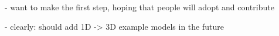 \documentclass[journal abbreviations, manuscript]{copernicus}
\begin{document}
- want to make the first step, hoping that people will adopt and contribute

- clearly: should add 1D -> 3D example models in the future












\appendix
\section{}    %

\subsection{}     %


\noappendix       %



\end{document}
